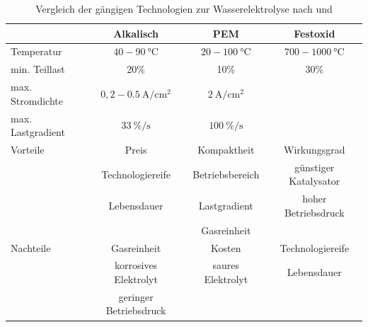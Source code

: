 \begin{table}[ht]
		\centering
		\caption{Vergleich der gängigen Technologien zur Wasserelektrolyse nach \citet{milanzi_technischer_2018} und \citet{rashid_hydrogen_2015} }
		\begin{tabular}{l c c c}
		\toprule
		 & Alkalisch & PEM & Festoxid
		\\
		\midrule
		Temperatur & $40 - \SI{90}{\degreeCelsius}$ & $20 - \SI{100}{\degreeCelsius}$ & $700-\SI{1000}{\degreeCelsius}$\\
		min. Teillast & 20\% & 10\% & 30\% \\
		max. Stromdichte & $0,2 - \SI{0,5}{\A\per\cm\squared}$ & $\SI{2}{\A\per\cm\squared}$ &\\
		max. Lastgradient & $\SI{33}{\%\per\s}$ & $\SI{100}{\%\per\s}$ & \\
		\midrule
		Vorteile & Preis & Kompaktheit & Wirkungsgrad\\
		& Technologiereife & Betriebsbereich & günstiger Katalysator\\
		& Lebensdauer & Lastgradient & hoher Betriebsdruck\\
		& & Gasreinheit&\\
		\midrule
		Nachteile & Gasreinheit & Kosten & Technologiereife\\
		& korrosives Elektrolyt & saures Elektrolyt & Lebensdauer\\
		& geringer Betriebsdruck & & \\
		\bottomrule
		\end{tabular}
		\label{tb:VglElektrolyseur}
		\end{table}	

